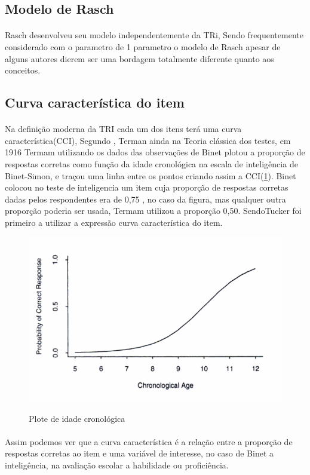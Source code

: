     \subsection{Modelo de Rasch}
    \paragraph{}
    	Rasch desenvolveu seu modelo independentemente da TRi, Sendo frequentemente considerado com o parametro de 1 parametro o modelo de Rasch apesar de alguns autores dierem ser uma bordagem totalmente diferente quanto aos conceitos.

	
\subsection{Curva característica do item}
    \paragraph{}
		Na definição moderna da TRI cada um dos itens terá uma curva característica(CCI), Segundo \cite{Baker}, Terman ainda na Teoria clássica dos testes, em 1916 Termam utilizando os dados das observações de Binet plotou a proporção de respostas corretas como função da idade cronológica na escala de inteligência de Binet-Simon, e traçou uma linha entre os pontos criando assim a CCI(\ref{fig:cci_age}). Binet colocou no teste de inteligencia um item cuja proporção de respostas corretas dadas pelos respondentes era de 0,75 , no caso da figura, mas qualquer outra proporção poderia ser usada, Termam utilizou a proporção 0,50. SendoTucker foi primeiro a utilizar a expressão curva característica do item.
	\begin{figure}[!h]
	    \centering
	    \caption{Plote de idade cronológica}
	    \includegraphics[width=0.5\linewidth]{img/age}
	    \label{fig:cci_age}
	\end{figure}
	   
	\paragraph{}
    	Assim podemos ver que a curva característica é a relação entre a proporção de respostas corretas ao item e uma variável de interesse, no caso de Binet a inteligência, na avaliação escolar a habilidade ou proficiência.
